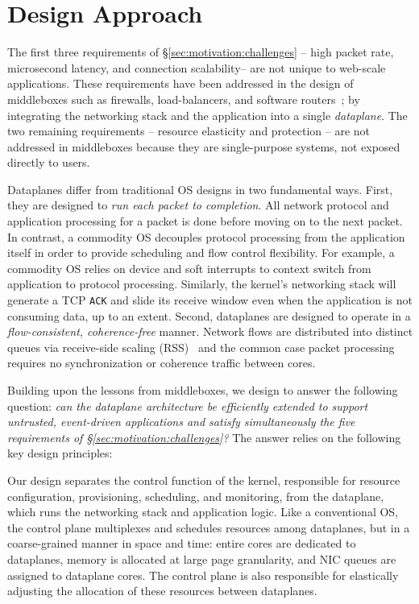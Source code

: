 \section{\ix Design Approach}
\label{sec:design}

The first three requirements of \S\ref{sec:motivation:challenges} --
high packet rate, microsecond latency, and connection scalability--
are not unique to web-scale applications.  These requirements have
been addressed in the design of middleboxes such as firewalls,
load-balancers, and software
routers~\cite{routebricks,click};
by integrating the networking stack and the application into a single
\emph{dataplane}. The two remaining requirements -- resource
elasticity and protection -- are not addressed in middleboxes because
they are single-purpose systems, not exposed directly to users.

Dataplanes differ from traditional OS designs in two fundamental
ways. First, they are designed to \emph{run each packet to
  completion}. All network protocol and application processing for a
packet is done before moving on to the next packet.  In contrast, a
commodity OS decouples protocol processing from the application itself
in order to provide scheduling and flow control flexibility.  For
example, a commodity OS relies on device and soft interrupts to
context switch from application to protocol processing. Similarly, the
kernel's networking stack will generate a TCP \texttt{ACK} and slide
its receive window even when the application is not consuming data, up
to an extent. Second, dataplanes are designed to operate in a
\emph{flow-consistent, coherence-free} manner.  Network flows are
distributed into distinct queues via receive-side scaling
(RSS)~\cite{url:rss} and the common case packet processing requires no
synchronization or coherence traffic between cores.

Building upon the lessons from middleboxes, we design \ix to answer
the following question: {\it {} can the dataplane architecture be
  efficiently extended to support untrusted, event-driven applications
  and satisfy simultaneously the five requirements of
  \S\ref{sec:motivation:challenges}?}  The answer relies on the
following key design principles:


Our design separates the control function of the kernel, responsible
for resource configuration, provisioning, scheduling, and monitoring,
from the dataplane, which runs the networking stack and application
logic.  Like a conventional OS, the control plane multiplexes and
schedules resources among dataplanes, but in a coarse-grained manner
in space and time: entire cores are dedicated to dataplanes,
memory is allocated at large page granularity, and
NIC queues are assigned to dataplane cores. The control plane is also responsible
for elastically adjusting the allocation of these resources between dataplanes.

